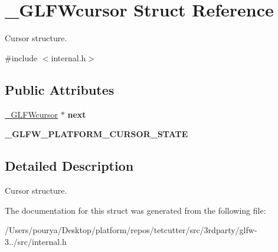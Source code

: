 \hypertarget{struct__GLFWcursor}{}\section{\+\_\+\+G\+L\+F\+Wcursor Struct Reference}
\label{struct__GLFWcursor}


Cursor structure.  




{\ttfamily \#include $<$internal.\+h$>$}

\subsection*{Public Attributes}
\begin{DoxyCompactItemize}
\item 
\hypertarget{struct__GLFWcursor_a3001692b71165b5c9c72137343f4570f}{}\hyperlink{struct__GLFWcursor}{\+\_\+\+G\+L\+F\+Wcursor} $\ast$ {\bfseries next}\label{struct__GLFWcursor_a3001692b71165b5c9c72137343f4570f}

\item 
\hypertarget{struct__GLFWcursor_a099bf361acbcec60ee5e784a973a581f}{}{\bfseries \+\_\+\+G\+L\+F\+W\+\_\+\+P\+L\+A\+T\+F\+O\+R\+M\+\_\+\+C\+U\+R\+S\+O\+R\+\_\+\+S\+T\+A\+T\+E}\label{struct__GLFWcursor_a099bf361acbcec60ee5e784a973a581f}

\end{DoxyCompactItemize}


\subsection{Detailed Description}
Cursor structure. 

The documentation for this struct was generated from the following file\+:\begin{DoxyCompactItemize}
\item 
/\+Users/pourya/\+Desktop/platform/repos/tetcutter/src/3rdparty/glfw-\/3../src/internal.\+h\end{DoxyCompactItemize}
